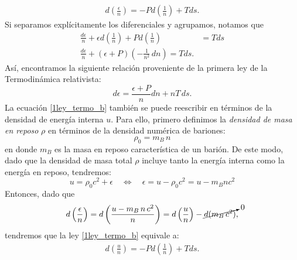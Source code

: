 \begin{align}\label{1ley_termo_b}
\boxed{d\left(\frac{\epsilon}{n}\right)=-Pd\left(\frac{1}{n}\right)+Tds.}
\end{align}
Si separamos explícitamente los diferenciales y agrupamos, notamos que
\begin{align}
\frac{d\epsilon}{n}+\epsilon d\left(\frac{1}{n}\right)+Pd\left(\frac{1}{n}\right)&=Tds\\
\frac{d\epsilon}{n}+(\epsilon +P)\left(-\frac{1}{n^2}\,dn\right)=Tds.
\end{align}
Así, encontramos la siguiente relación proveniente de la primera ley de la Termodinámica relativista:
\begin{equation}\label{1leytermo}
\boxed{d\epsilon=\frac{\epsilon+P}{n}dn+nT\,ds.}
\end{equation}
La ecuación \eqref{1ley_termo_b} también se puede reescribir en términos de la densidad de energía interna $u$. Para ello, primero definimos la \textit{densidad de masa en reposo} $\rho$ en términos de la densidad numérica de bariones:
\begin{equation}\label{masa_reposo}
\rho_0=m_B\,n
\end{equation}
en donde $m_B$ es la masa en reposo característica de un barión.
De este modo, dado que la densidad de masa total $\rho$ incluye tanto la energía interna como la energía en reposo, tendremos:
\begin{equation}\label{energia_interna_y_densidad}
\boxed{u=\rho_0 c^2+\epsilon \quad\Leftrightarrow\quad \epsilon=u-\rho_0c^2=u-m_B nc^2}
\end{equation}
Entonces, dado que
\begin{equation}
d\left(\frac{\epsilon}{n}\right)=d\left(\frac{u-m_B\,n\,c^2}{n}\right)=d\left(\frac{u}{n}\right)-\cancelto{0}{d(m_B\,c^2)},
\end{equation}
tendremos que la ley \eqref{1ley_termo_b} equivale a:
\begin{align}
\boxed{d\left(\frac{u}{n}\right)=-Pd\left(\frac{1}{n}\right)+Tds.}\label{1ley_termo}
\end{align}
